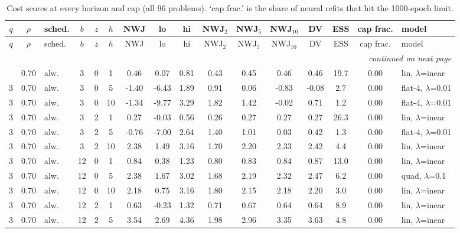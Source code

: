 \documentclass[10pt]{article}
\begin{document}
\begin{scriptsize}
\setlength{\tabcolsep}{3pt}
\begin{longtable}{cclcc c ccc ccc c cc l}
\caption{Cost scores at every horizon and cap (all 96 problems). `cap frac.' is the share of neural refits that hit the 1000-epoch limit.}\label{tab:app-cost}\\
\toprule
$q$ & $\rho$ & sched. & $b$ & $z$ & $h$ & NWJ & lo & hi & NWJ$_2$ & NWJ$_5$ & NWJ$_{10}$ & DV & ESS & cap frac. & model \\
\midrule
\endfirsthead
\toprule
$q$ & $\rho$ & sched. & $b$ & $z$ & $h$ & NWJ & lo & hi & NWJ$_2$ & NWJ$_5$ & NWJ$_{10}$ & DV & ESS & cap frac. & model \\
\midrule
\endhead
\midrule
\multicolumn{16}{r}{\emph{continued on next page}}\\
\endfoot
\bottomrule
\endlastfoot
3 & 0.70 & alw. & 3 & 0 & 1 & 0.46 & 0.07 & 0.81 & 0.43 & 0.45 & 0.46 & 0.46 & 19.7 & 0.00 & lin, $\lambda$=inear \\
3 & 0.70 & alw. & 3 & 0 & 5 & -1.40 & -6.43 & 1.89 & 0.91 & 0.06 & -0.83 & -0.08 & 2.7 & 0.00 & flat-4, $\lambda$=0.01 \\
3 & 0.70 & alw. & 3 & 0 & 10 & -1.34 & -9.77 & 3.29 & 1.82 & 1.42 & -0.02 & 0.71 & 1.2 & 0.00 & flat-4, $\lambda$=0.01 \\
3 & 0.70 & alw. & 3 & 2 & 1 & 0.27 & -0.03 & 0.56 & 0.26 & 0.27 & 0.27 & 0.27 & 26.3 & 0.00 & lin, $\lambda$=inear \\
3 & 0.70 & alw. & 3 & 2 & 5 & -0.76 & -7.00 & 2.64 & 1.40 & 1.01 & 0.03 & 0.42 & 1.3 & 0.00 & flat-4, $\lambda$=0.01 \\
3 & 0.70 & alw. & 3 & 2 & 10 & 2.38 & 1.49 & 3.16 & 1.70 & 2.20 & 2.33 & 2.42 & 4.4 & 0.00 & lin, $\lambda$=inear \\
3 & 0.70 & alw. & 12 & 0 & 1 & 0.84 & 0.38 & 1.23 & 0.80 & 0.83 & 0.84 & 0.87 & 13.0 & 0.00 & lin, $\lambda$=inear \\
3 & 0.70 & alw. & 12 & 0 & 5 & 2.38 & 1.67 & 3.02 & 1.68 & 2.19 & 2.32 & 2.47 & 6.2 & 0.00 & quad, $\lambda$=0.1 \\
3 & 0.70 & alw. & 12 & 0 & 10 & 2.18 & 0.75 & 3.16 & 1.80 & 2.15 & 2.18 & 2.20 & 3.0 & 0.00 & lin, $\lambda$=inear \\
3 & 0.70 & alw. & 12 & 2 & 1 & 0.63 & -0.23 & 1.32 & 0.71 & 0.67 & 0.64 & 0.64 & 8.9 & 0.00 & lin, $\lambda$=inear \\
3 & 0.70 & alw. & 12 & 2 & 5 & 3.54 & 2.69 & 4.36 & 1.98 & 2.96 & 3.35 & 3.63 & 4.8 & 0.00 & lin, $\lambda$=inear \\

\end{longtable}
\end{scriptsize}
\end{document}
